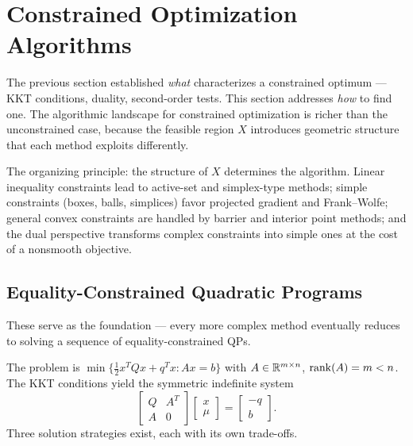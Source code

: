 \section{Constrained Optimization Algorithms}\label{sec:constrained-algorithms}

The previous section established \emph{what} characterizes a constrained optimum --- KKT conditions, duality, second-order tests.
This section addresses \emph{how} to find one.
The algorithmic landscape for constrained optimization is richer than the unconstrained case, because the feasible region $X$ introduces geometric structure that each method exploits differently.

The organizing principle: the structure of $X$ determines the algorithm.
Linear inequality constraints lead to active-set and simplex-type methods; simple constraints (boxes, balls, simplices) favor projected gradient and Frank--Wolfe; general convex constraints are handled by barrier and interior point methods; and the dual perspective transforms complex constraints into simple ones at the cost of a nonsmooth objective.


\subsection{Equality-Constrained Quadratic Programs}\label{ssec:eq-constrained-qp}

These serve as the foundation --- every more complex method eventually reduces to solving a sequence of equality-constrained QPs.

The problem is $\min\{\frac{1}{2} x^T Q x + q^T x : Ax = b\}$ with $A \in \mathbb{R}^{m \times n}$, $\operatorname{rank}(A) = m < n$.
The KKT conditions yield the symmetric indefinite system
\begin{equation}\label{eq:kkt-system}
	\begin{bmatrix} Q & A^T \\ A & 0 \end{bmatrix}
	\begin{bmatrix} x \\ \mu \end{bmatrix}
	= \begin{bmatrix} -q \\ b \end{bmatrix}.
\end{equation}
Three solution strategies exist, each with its own trade-offs.

